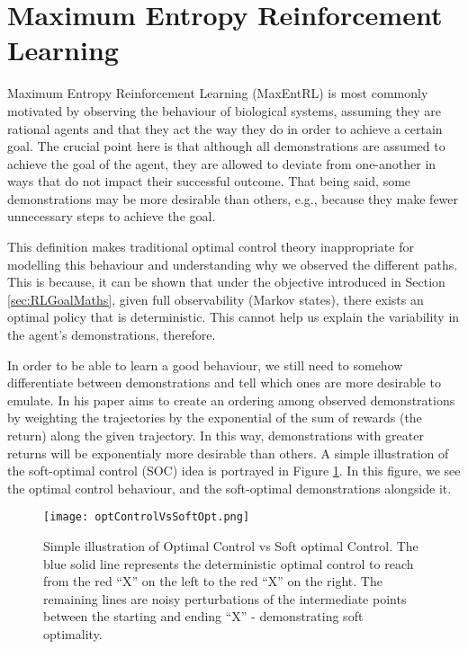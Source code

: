 \documentclass{report}
\numberwithin{equation}{section}
\numberwithin{figure}{section}
\numberwithin{table}{section}
\numberwithin{algorithm}{section}
\begin{document}
\section{Maximum Entropy Reinforcement Learning}\label{sec:MaxEntRL}
Maximum Entropy Reinforcement Learning (MaxEntRL) is most commonly 
motivated by observing the behaviour of biological systems, assuming 
they are rational agents and that they act the way they do in order to achieve 
a certain goal. The crucial point here is that although all 
demonstrations are assumed to achieve the goal of the agent, 
they are allowed to deviate from one-another in ways that 
do not impact their successful outcome. That being said, 
some demonstrations may be more desirable than others, e.g., 
because they make fewer unnecessary steps to achieve the goal.

This definition makes 
traditional optimal control theory inappropriate for modelling 
this behaviour and understanding why we observed the different 
paths. This is because, it can be shown that under the objective 
introduced in Section \ref{sec:RLGoalMaths}, given full observability 
(Markov states), there exists an optimal policy that is deterministic.
This cannot help us explain the variability in the agent's demonstrations,
therefore.

In order to be able to learn a good behaviour, we still 
need to somehow differentiate between demonstrations and tell 
which ones are more desirable to emulate. 
In his paper \cite{Ziebart2008} aims to create an ordering among 
observed demonstrations by weighting the trajectories 
by the exponential of the sum of rewards (the return) along 
the given trajectory. In this way, demonstrations with greater 
returns 
will be exponentialy more desirable than others. A simple illustration 
of the soft-optimal control (SOC) idea is portrayed in Figure \ref{fig:softopt}. 
In this figure, we see the optimal control behaviour, and the 
soft-optimal demonstrations alongside it.


\begin{figure}[H]
  \begin{center}
    \texttt{[image: optControlVsSoftOpt.png]}
  \end{center}
  \caption{\label{fig:softopt}Simple illustration of Optimal Control vs Soft optimal 
  Control. The blue solid line represents the deterministic optimal 
  control to reach from the red ``X'' on the left to the 
  red ``X'' on the right. The remaining lines 
  are noisy perturbations of the intermediate points 
  between the starting and ending ``X'' - demonstrating 
  soft optimality.}
\end{figure}
\end{document}
